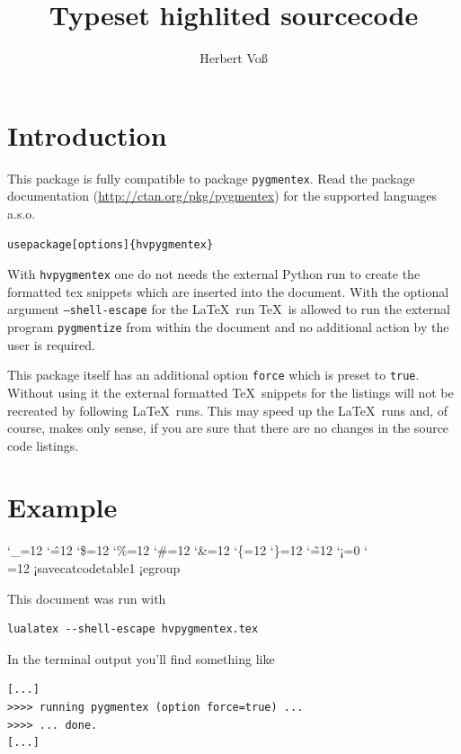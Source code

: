 \documentclass[DIV=12]{scrartcl}
\title{Typeset highlited sourcecode}
\author{Herbert Voß}
\begin{document}
\maketitle

\section{Introduction}
This package is fully compatible to package \texttt{pygmentex}. Read
the package documentation (\url{http://ctan.org/pkg/pygmentex}) for the
supported languages a.s.o.  

\begin{verbatim}
usepackage[options]{hvpygmentex}
\end{verbatim}



With \texttt{hvpygmentex} one do not needs the external Python run to
create the formatted tex snippets  which are inserted into the document.
With the optional argument \texttt{--shell-escape} for the \LaTeX\ run
\TeX\ is allowed to run the external program \texttt{pygmentize} from within the document and
no additional action by the user is required.

This package itself has an additional option \texttt{force} which is
preset to \texttt{true}. Without using it  the external
formatted \TeX\ snippets for the listings will not be recreated by following \LaTeX\ runs. This
may speed up the \LaTeX\ runs and, of course,  makes only sense, if you are sure that there
are no changes in the source code listings.


\section{Example}

\begin{pygmented}[lang=tex,font=\ttfamily\small]
\bgroup
{}
%
\catcode`\_=12 \catcode`\^=12 \catcode`\$=12 \catcode`\%=12 \catcode`\#=12 
\catcode`\&=12 \catcode`\{=12 \catcode`\}=12 \catcode`\~=12 \catcode`¡=0   
\catcode`\\=12
¡savecatcodetable1
¡egroup
\end{pygmented}


This document was run with

\begin{verbatim}
lualatex --shell-escape hvpygmentex.tex
\end{verbatim}

In the terminal output you'll find something like

\begin{verbatim}
[...]
>>>> running pygmentex (option force=true) ...
>>>> ... done.
[...]
\end{verbatim}
\end{document}
